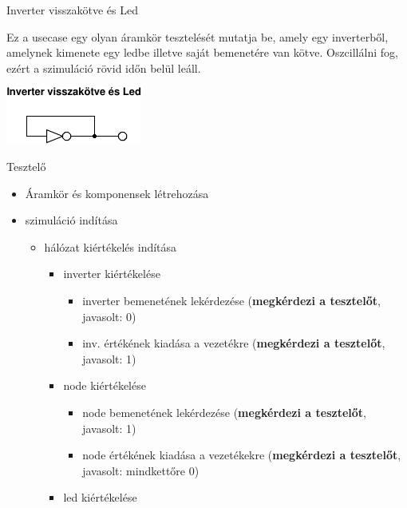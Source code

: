 \usecase
{Inverter visszakötve és Led}
{Ez a usecase egy olyan áramkör tesztelését mutatja be, amely egy inverterből, amelynek kimenete egy ledbe illetve saját bemenetére van kötve. Oszcillálni fog, ezért a szimuláció rövid időn belül leáll.
\newline
\begin{center}
\vspace{-15pt}
\includegraphics[scale=1.5]{dw/circuit_test4.pdf}
\vspace{-10pt}
\end{center}}
{Tesztelő}
{\vspace{-10pt}
\begin{itemize}
\setlength{\itemsep}{0cm}%
\setlength{\parskip}{0cm}%
\setlength{\itemindent}{-15pt}%
\item Áramkör és komponensek létrehozása
\item szimuláció indítása
\begin{itemize}
\setlength{\itemsep}{0cm}%
\setlength{\parskip}{0cm}%
\setlength{\itemindent}{-35pt}%
\item hálózat kiértékelés indítása
\begin{itemize}
\setlength{\itemsep}{0cm}%
\setlength{\parskip}{0cm}%
\setlength{\itemindent}{-50pt}%
	\item inverter kiértékelése
	\begin{itemize}
	\setlength{\itemsep}{0cm}%
	\setlength{\parskip}{0cm}%
	\setlength{\itemindent}{-65pt}%
		\item inverter bemenetének lekérdezése (\textbf{megkérdezi a tesztelőt}, javasolt: 0)
		\item inv. értékének kiadása a vezetékre (\textbf{megkérdezi a tesztelőt}, javasolt: 1)
	\end{itemize}
	\item node kiértékelése
	\begin{itemize}
	\setlength{\itemsep}{0cm}%
	\setlength{\parskip}{0cm}%
	\setlength{\itemindent}{-65pt}%
		\item node bemenetének lekérdezése (\textbf{megkérdezi a tesztelőt}, javasolt: 1)
		\item node értékének kiadása a vezetékekre (\textbf{megkérdezi a tesztelőt}, javasolt: mindkettőre 0)
	\end{itemize}
	\item led kiértékelése

\end{itemize}
\end{itemize}
\end{itemize}}
